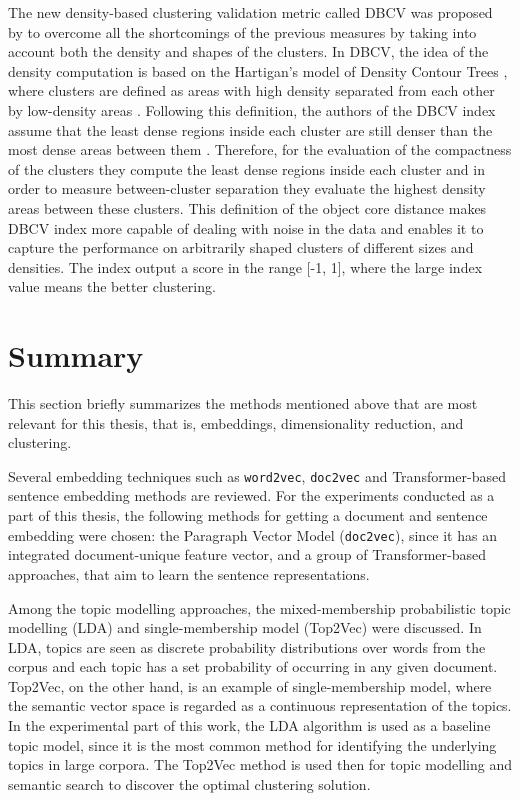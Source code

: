 \documentclass[fontsize=12pt,a4paper,twoside,openany]{scrbook}
\begin{document}
The new density-based clustering validation metric called DBCV was proposed by \textcite{Moulavi14} to overcome all the shortcomings of the previous measures by taking into account both the density and shapes of the clusters. In DBCV, the idea of the density computation is based on the Hartigan’s model of Density Contour Trees \parencite{Hartigan75}, where clusters are defined as areas with high density separated from each other by low-density areas \parencite{Moulavi14, Hartigan75}. Following this definition, the authors of the DBCV index assume that the least dense regions inside each cluster are still denser than the most dense areas between them \parencite{Moulavi14}. Therefore, for the evaluation of the compactness of the clusters they compute the least dense regions inside each cluster and in order to measure between-cluster separation they evaluate the highest density areas between these clusters. This definition of the object core distance makes DBCV index more capable of dealing with noise in the data and enables it to capture the performance on arbitrarily shaped clusters of different sizes and densities. The index output a score in the range [-1, 1], where the large index value means the better clustering.

\section{Summary}
This section briefly summarizes the methods mentioned above that are most relevant for this thesis, that is, embeddings, dimensionality reduction, and clustering. 

Several embedding techniques such as \verb|word2vec|, \verb|doc2vec| and Transformer-based sentence embedding methods are reviewed. For the experiments conducted as a part of this thesis, the following methods for getting a document and sentence embedding were chosen: the Paragraph Vector Model (\verb|doc2vec|), since it has an integrated document-unique feature vector, and a group of Transformer-based approaches, that aim to learn the sentence representations.

Among the topic modelling approaches, the mixed-membership probabilistic topic modelling (LDA) and single-membership model (Top2Vec) were discussed. In LDA, topics are seen as discrete probability distributions over words from the corpus and each topic has a set probability of occurring in any given document. Top2Vec, on the other hand, is an example of single-membership model, where the semantic vector space is regarded as a continuous representation of the topics. In the experimental part of this work, the LDA algorithm is used as a baseline topic model, since it is the most common method for identifying the underlying topics in large corpora. The Top2Vec method is used then for topic modelling and semantic search to discover the optimal clustering solution. 
\end{document}
